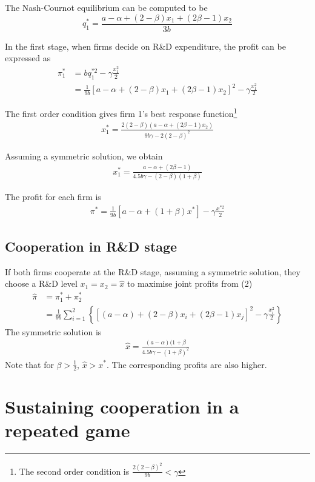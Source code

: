 \documentclass{article}
\begin{document}
The Nash-Cournot equilibrium can be computed to be 
\begin{equation*}
q_1^* = \frac{a-\alpha+(2-\beta)x_1+(2\beta-1)x_2}{3b}
\end{equation*}


In the first stage, when firms decide on R\&D expenditure, the profit can be expressed as
\begin{align}
    \pi_1^* &= bq_1^{*2} - \gamma\frac{x_1^2}{2} \\
    &= \frac{1}{9b}[a-\alpha+(2-\beta)x_1+(2\beta-1)x_2]^2 - \gamma\frac{x_1^2}{2} 
\end{align}


The first order condition gives firm 1's best response function\footnote{ The second order condition is $\frac{2(2-\beta)^2}{9b} < \gamma$}
\begin{align}
    x_1^* = \frac{2(2-\beta)(a-\alpha+(2\beta -1)x_2)}{9b\gamma-2(2-\beta)^2} 
\end{align}


Assuming a symmetric solution, we obtain
\begin{align*}
    x_1^* = \frac{a-\alpha+(2\beta -1)}{4.5b\gamma-(2-\beta)(1+\beta)} 
\end{align*}

The profit for each firm is 
\begin{align*}
    \pi^* = \frac{1}{9b}[a-\alpha + (1+\beta)x^*] - \gamma\frac{x^{*2}}{2} 
\end{align*}

\subsection{Cooperation in R\&D stage}

If both firms cooperate at the R\&D stage, assuming a symmetric solution, they choose a R\&D level $x_1 = x_2 = \hat{x}$ to maximise joint profits from (2)
\begin{align*}
\hat{\pi} &= \pi_1^* + \pi_2^*\\
    &= \frac{1}{9b} \sum_{i=1}^2\left\{[(a-\alpha) + (2-\beta)x_i + (2\beta -1)x_j]^2-\gamma\frac{x_i^2}{2}\right\}
\end{align*}
The symmetric solution is
\begin{align*}
\hat{x} = \frac{(a-\alpha)(1+\beta}{4.5b\gamma-(1+\beta)^2} 
\end{align*}
Note that for $\beta > \frac{1}{2} $, $\hat{x}>x^*$. The corresponding profits are also higher. 

\section{Sustaining cooperation in a repeated game}
\end{document}

